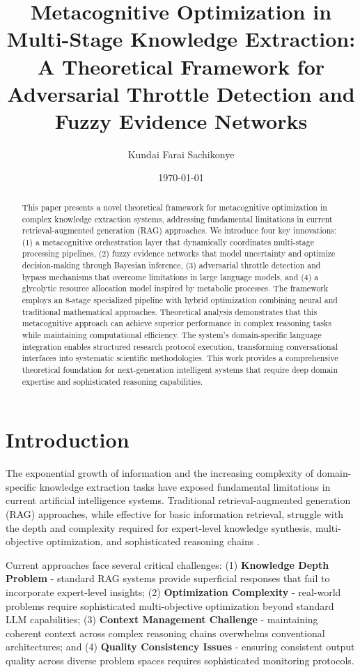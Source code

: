 \documentclass[12pt,a4paper]{article}
\title{Metacognitive Optimization in Multi-Stage Knowledge Extraction: A Theoretical Framework for Adversarial Throttle Detection and Fuzzy Evidence Networks}
\author{
Kundai Farai Sachikonye
}
\date{\today}
\begin{document}
\maketitle

\begin{abstract}
This paper presents a novel theoretical framework for metacognitive optimization in complex knowledge extraction systems, addressing fundamental limitations in current retrieval-augmented generation (RAG) approaches. We introduce four key innovations: (1) a metacognitive orchestration layer that dynamically coordinates multi-stage processing pipelines, (2) fuzzy evidence networks that model uncertainty and optimize decision-making through Bayesian inference, (3) adversarial throttle detection and bypass mechanisms that overcome limitations in large language models, and (4) a glycolytic resource allocation model inspired by metabolic processes. The framework employs an 8-stage specialized pipeline with hybrid optimization combining neural and traditional mathematical approaches. Theoretical analysis demonstrates that this metacognitive approach can achieve superior performance in complex reasoning tasks while maintaining computational efficiency. The system's domain-specific language integration enables structured research protocol execution, transforming conversational interfaces into systematic scientific methodologies. This work provides a comprehensive theoretical foundation for next-generation intelligent systems that require deep domain expertise and sophisticated reasoning capabilities.
\end{abstract}

\section{Introduction}

The exponential growth of information and the increasing complexity of domain-specific knowledge extraction tasks have exposed fundamental limitations in current artificial intelligence systems. Traditional retrieval-augmented generation (RAG) approaches, while effective for basic information retrieval, struggle with the depth and complexity required for expert-level knowledge synthesis, multi-objective optimization, and sophisticated reasoning chains \cite{sachikonye2024}.

Current approaches face several critical challenges: (1) \textbf{Knowledge Depth Problem} - standard RAG systems provide superficial responses that fail to incorporate expert-level insights; (2) \textbf{Optimization Complexity} - real-world problems require sophisticated multi-objective optimization beyond standard LLM capabilities; (3) \textbf{Context Management Challenge} - maintaining coherent context across complex reasoning chains overwhelms conventional architectures; and (4) \textbf{Quality Consistency Issues} - ensuring consistent output quality across diverse problem spaces requires sophisticated monitoring protocols.
\end{document}
